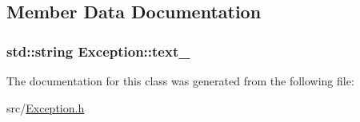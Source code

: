 \subsection{\-Member \-Data \-Documentation}
\hypertarget{classException_a404e79b557f64d95acfb5dccbb864860}{
\subsubsection[{text\-\_\-}]{\setlength{\rightskip}{0pt plus 5cm}std\-::string {\bf \-Exception\-::text\-\_\-}}}\label{d4/d67/classException_a404e79b557f64d95acfb5dccbb864860}


\-The documentation for this class was generated from the following file\-:\begin{DoxyCompactItemize}
\item 
src/\hyperlink{Exception_8h}{\-Exception.\-h}\end{DoxyCompactItemize}
